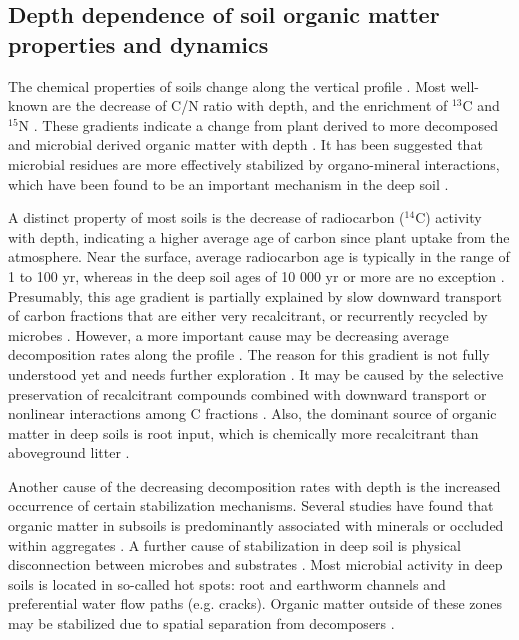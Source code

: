 \documentclass[11pt, oneside, a4paper]{article}   	%
\begin{document}
\subsection{Depth dependence of soil organic matter properties and dynamics}
The chemical properties of soils change along the vertical profile \citep{Rumpel2011, Vancampenhout2012}. Most well-known are the decrease of
C/N ratio with depth, and the enrichment of $^{13}$C and $^{15}$N \citep{Ehleringer2000, Nadelhoffer1988, Hogberg1997, Paul2020}. These gradients indicate a change from plant derived
to more decomposed and microbial derived organic matter with depth \citep{Rumpel2002, Rumpel2011, Baisden2002}. It has been suggested that microbial residues are more effectively stabilized by organo-mineral interactions, which have been found to be an important mechanism in the deep soil
\citep{Rumpel2012}.

A distinct property of most soils is the decrease of radiocarbon ($^{14}$C) activity with
depth, indicating a higher average age of carbon since plant uptake from the atmosphere.
Near the surface, average radiocarbon age is typically in the range of 1 to 100 yr,
whereas in the deep soil ages of 10 000 yr or more are no exception \citep{Mathieu2015, He2016, Lawrence2020, Rumpel2011}. Presumably, this age gradient is partially explained by slow
downward transport of carbon fractions that are either very recalcitrant, or recurrently recycled by microbes \citep{Elzein1995, Kaiser2012}.
However, a more important cause may be decreasing average decomposition rates along
the profile \citep{Jenkinson2008, Koven2013BGS, Persson2000}. The reason for this gradient is not fully understood
yet and needs further exploration \citep{Guo2023}. It may be caused by the selective preservation of recalcitrant compounds combined with downward transport \citep{Elzein1995, Luo2020} or nonlinear interactions among C fractions \citep{Guenet2013, Liang2018}. Also, the dominant
source of organic matter in deep soils is root input, which is chemically more recalcitrant than aboveground litter \citep{Rasse2005}.

Another cause of the decreasing decomposition rates with depth is the increased occurrence of certain stabilization mechanisms. Several studies have found that organic
matter in subsoils is predominantly associated with minerals \citep{Rumpel2011, Eusterhues2003} \citep{Rasmussen2018} or occluded within aggregates \citep{Moni2010}. A further cause of stabilization in deep soil is physical disconnection between microbes and substrates \citep{Don2013}. Most microbial activity in deep soils is located in
so-called hot spots: root and earthworm channels and preferential water flow paths
(e.g. cracks). Organic matter outside of these zones may be stabilized due to spatial
separation from decomposers \citep{Chabbi2009}. 
\end{document}
